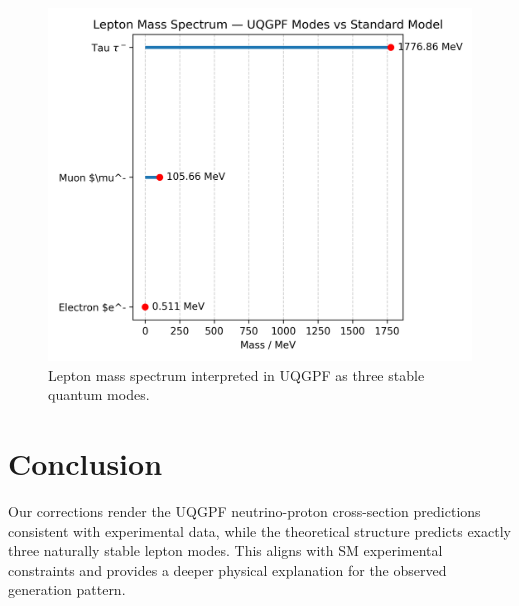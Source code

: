 \documentclass[aps,prd,reprint,superscriptaddress,showpacs,nofootinbib]{revtex4-2}
\begin{document}
\begin{figure}[ht]
    \centering
    \includegraphics[width=0.45\\textwidth]{lepton_mass_spectrum.png}
    \caption{Lepton mass spectrum interpreted in UQGPF as three stable quantum modes.}
    \label{fig:lepton_spectrum}
\end{figure}

\section{Conclusion}
Our corrections render the UQGPF neutrino-proton cross-section predictions consistent with experimental data, while the theoretical structure predicts exactly three naturally stable lepton modes. This aligns with SM experimental constraints and provides a deeper physical explanation for the observed generation pattern.



\end{document}

